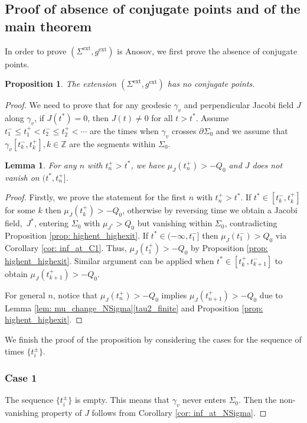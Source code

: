 \documentclass[10pt]{amsart}
\newcommand{\ext}{\mathrm{ext}}
\newtheorem{lemma}[theorem]{Lemma}
\newtheorem{proposition}[theorem]{Proposition}
\theoremstyle{definition}
\renewcommand{\>}{{\rangle}}
\newcommand{\<}{{\langle}}
\begin{document}
\subsection{Proof of absence of conjugate points and of the main theorem}\label{section: absence of conjugate points and the main theorem}
In order to prove $(\Sigma^{\ext}, g^{\ext})$ is Anosov, we first prove the absence of conjugate points.
\begin{proposition}\label{prop: noconjpts}
The extension $(\Sigma^{\ext}, g^{\ext})$ has no conjugate points.
\end{proposition}
\begin{proof}
We need to prove that for any geodesic $\gamma_v$ and perpendicular Jacobi field $J$ along $\gamma_v$, if $J(t^*)=0$, then $J(t)\neq 0$ for all $t>t^*$. Assume $t^-_1\leq t^+_1<t^-_2\leq t^+_2<\cdots$ are the times when $\gamma_v$ crosses $\partial\Sigma_0$ and we assume that $\gamma_v[t^-_k, t^+_k], k\in\mathbb{Z}$ are the segments within $\Sigma_0$.

\begin{lemma}\label{lem: t*<t+n}
For any $n$ with $t^+_n>t^*$, we have $\mu_J(t^+_{n})>-Q_0$ and $J$ does not vanish on $(t^*, t^+_n]$.
\end{lemma}
\begin{proof}
Firstly, we prove the statement for the first $n$ with $t^+_n>t^*$. If $t^*\in [t^-_k, t^+_k]$ for some $k$ then $\mu_J(t^+_k)>-Q_0$, otherwise by reversing time we obtain a Jacobi field,~$J^*$, entering $\Sigma_0$ with $\mu_{J^*}>Q_0$ but vanishing within $\Sigma_0$, contradicting Proposition \ref{prop: highent_highexit}. If $t^*\in (-\infty, t^-_1]$ then $\mu_J(t^-_{1})>Q_0$ via Corollary \ref{cor: inf_at_C1}. Thus, $\mu_J(t^+_{1})>-Q_0$ by Proposition \ref{prop: highent_highexit}. Similar argument can be applied when $t^*\in [t^+_k, t^-_{k+1}]$ to obtain $\mu_J(t^+_{k+1})>-Q_0$.

For general $n$, notice that $\mu_J(t^+_{n})>-Q_0$ implies $\mu_J(t^+_{n+1})>-Q_0$ due to Lemma \ref{lem: mu_change_NSigma}\eqref{tau2_finite} and Proposition \ref{prop: highent_highexit}.
\end{proof}

We finish the proof of the proposition by considering the cases for the sequence of times $\{t_i^{\pm}\}$.

\subsubsection*{Case 1} The sequence $\{t_i^{\pm}\}$ is empty. This means that $\gamma_v$ never enters $\Sigma_0$. Then the non-vanishing property of $J$ follows from Corollary \ref{cor: inf_at_NSigma}.


\end{proof}
\end{document}
